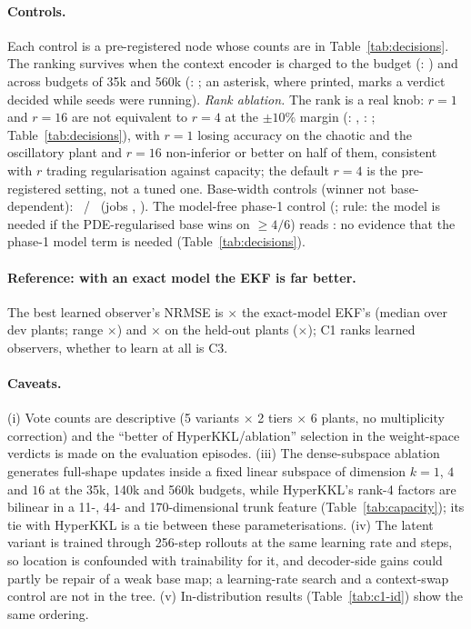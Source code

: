 \paragraph{Controls.} Each control is a pre-registered node whose counts are in Table~\ref{tab:decisions}. The ranking survives when the context encoder is charged to the budget (: \OutcomeCOneCtx) and across budgets of 35k and 560k (: \OutcomeCOneBudget; an asterisk, where printed, marks a verdict decided while seeds were running). \emph{Rank ablation.} The rank is a real knob: $r=1$ and $r=16$ are not equivalent to $r=4$ at the $\pm10\%$ margin (: \OutcomeCOneRankOne, : \OutcomeCOneRankSixteen; Table~\ref{tab:decisions}), with $r=1$ losing accuracy on the chaotic and the oscillatory plant and $r=16$ non-inferior or better on half of them, consistent with $r$ trading regularisation against capacity; the default $r=4$ is the pre-registered setting, not a tuned one. Base-width controls (winner not base-dependent): \OutcomeCOneBasewidthSixtyFour\ / \OutcomeCOneBasewidthTwoFiveSix\ (jobs \JobsCOneBasewidthSixtyFour, \JobsCOneBasewidthTwoFiveSix). The model-free phase-1 control (; rule: the model is needed if the PDE-regularised base wins on $\ge4/6$) reads \OutcomeCOneModelfree: no evidence that the phase-1 model term is needed (Table~\ref{tab:decisions}).

\paragraph{Reference: with an exact model the EKF is far better.} The best learned observer's  NRMSE is \ConeLearnedOverEkfMedianSeq$\times$ the exact-model EKF's (median over dev plants; range \ConeLearnedOverEkfRangeSeq$\times$) and \CtestLearnedOverEkfMedianSeq$\times$ on the held-out plants (\CtestLearnedOverEkfRangeSeq$\times$); C1 ranks learned observers, whether to learn at all is C3.

\paragraph{Caveats.} (i) Vote counts are descriptive (5 variants $\times$ 2 tiers $\times$ 6 plants, no multiplicity correction) and the ``better of HyperKKL/ablation'' selection in the weight-space verdicts is made on the evaluation episodes. (iii) The dense-subspace ablation generates full-shape updates inside a fixed linear subspace of dimension $k=1$, $4$ and $16$ at the 35k, 140k and 560k budgets, while HyperKKL's rank-4 factors are bilinear in a 11-, 44- and 170-dimensional trunk feature (Table~\ref{tab:capacity}); its tie with HyperKKL is a tie between these parameterisations. (iv) The latent variant is trained through 256-step rollouts at the same learning rate and steps, so location is confounded with trainability for it, and decoder-side gains could partly be repair of a weak base map; a learning-rate search and a context-swap control are not in the tree. (v) In-distribution results (Table~\ref{tab:c1-id}) show the same ordering.
